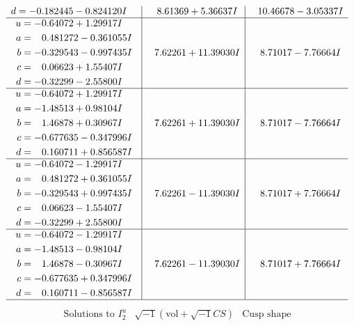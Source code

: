 \documentclass[1p]{elsarticle_modified}
\theoremstyle{definition}
\newcommand{\I}{\sqrt{-1}}
\begin{document}
$$\begin{array}{c|c|c}
\begin{aligned}
d &= -0.182445 - 0.824120 I\end{aligned}
 & \phantom{-}8.61369 + 5.36637 I & \phantom{-}10.46678 - 3.05337 I \\ \hline\begin{aligned}
u &= -0.64072 + 1.29917 I \\
a &= \phantom{-}0.481272 - 0.361055 I \\
b &= -0.329543 - 0.997435 I \\
c &= \phantom{-}0.06623 + 1.55407 I \\
d &= -0.32299 - 2.55800 I\end{aligned}
 & \phantom{-}7.62261 + 11.39030 I & \phantom{-}8.71017 - 7.76664 I \\ \hline\begin{aligned}
u &= -0.64072 + 1.29917 I \\
a &= -1.48513 + 0.98104 I \\
b &= \phantom{-}1.46878 + 0.30967 I \\
c &= -0.677635 - 0.347996 I \\
d &= \phantom{-}0.160711 + 0.856587 I\end{aligned}
 & \phantom{-}7.62261 + 11.39030 I & \phantom{-}8.71017 - 7.76664 I \\ \hline\begin{aligned}
u &= -0.64072 - 1.29917 I \\
a &= \phantom{-}0.481272 + 0.361055 I \\
b &= -0.329543 + 0.997435 I \\
c &= \phantom{-}0.06623 - 1.55407 I \\
d &= -0.32299 + 2.55800 I\end{aligned}
 & \phantom{-}7.62261 - 11.39030 I & \phantom{-}8.71017 + 7.76664 I \\ \hline\begin{aligned}
u &= -0.64072 - 1.29917 I \\
a &= -1.48513 - 0.98104 I \\
b &= \phantom{-}1.46878 - 0.30967 I \\
c &= -0.677635 + 0.347996 I \\
d &= \phantom{-}0.160711 - 0.856587 I\end{aligned}
 & \phantom{-}7.62261 - 11.39030 I & \phantom{-}8.71017 + 7.76664 I\\
 \hline 
 \end{array}$$\newpage$$\begin{array}{c|c|c}  
\text{Solutions to }I^u_{2}& \I (\text{vol} + \sqrt{-1}CS) & \text{Cusp shape}\\

\end{array}$$
\end{document}
